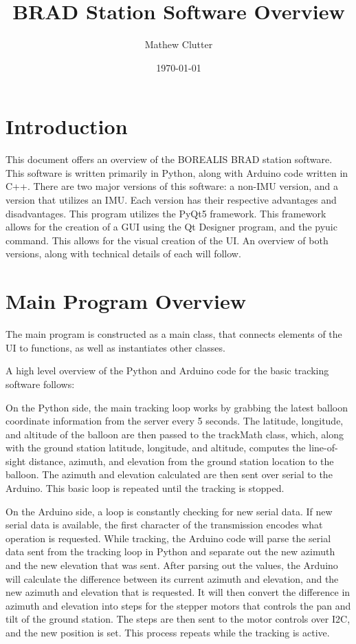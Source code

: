\documentclass{article}
\title{BRAD Station Software Overview}
\author{Mathew Clutter }
\date{\today}
\begin{document}
\maketitle

\section{Introduction}
This document offers an overview of the BOREALIS BRAD station software. This software is written primarily in Python, along with Arduino code written in C++. There are two major versions of this software: a non-IMU version, and a version that utilizes an IMU. Each version has their respective advantages and disadvantages. This program utilizes the PyQt5 framework. This framework allows for the creation of a GUI using the Qt Designer program, and the pyuic command. This allows for the visual creation of the UI. An overview of both versions, along with technical details of each will follow. 

\section{Main Program Overview}
The main program is constructed as a main class, that connects elements of the UI to functions, as well as instantiates other classes. 

A high level overview of the Python and Arduino code for the basic tracking software follows:

On the Python side, the main tracking loop works by grabbing the latest balloon coordinate information from the server every 5 seconds. The latitude, longitude, and altitude of the balloon are then passed to the trackMath class, which, along with the ground station latitude, longitude, and altitude, computes the line-of-sight distance, azimuth, and elevation from the ground station location to the balloon. The azimuth and elevation calculated are then sent over serial to the Arduino. This basic loop is repeated until the tracking is stopped. 

On the Arduino side, a loop is constantly checking for new serial data. If new serial data is available, the first character of the transmission encodes what operation is requested. While tracking, the Arduino code will parse the serial data sent from the tracking loop in Python and separate out the new azimuth and the new elevation that was sent. After parsing out the values, the Arduino will calculate the difference between its current azimuth and elevation, and the new azimuth and elevation that is requested. It will then convert the difference in azimuth and elevation into steps for the stepper motors that controls the pan and tilt of the ground station. The steps are then sent to the motor controls over I2C, and the new position is set. This process repeats while the tracking is active. 
\end{document}
